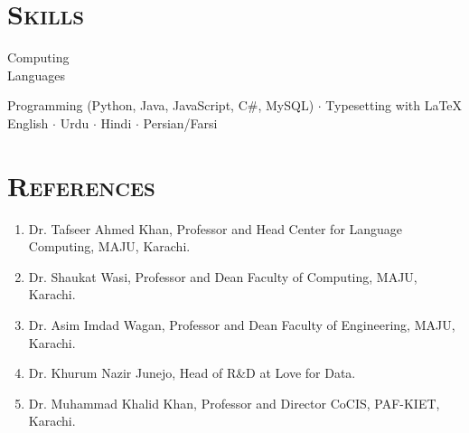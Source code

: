 \documentclass[a4paper, 10pt]{article}
\begin{document}
\section*{\normalfont\textsc{Skills}}
\hfill\begin{minipage}{0.17\textwidth}
Computing\textcolor{lightgray}{\dotfill}\\
Languages\textcolor{lightgray}{\dotfill}
\end{minipage}%
\begin{minipage}{0.8\textwidth}
Programming (Python, Java, JavaScript, C\#, MySQL) $\cdot$ Typesetting with \LaTeX\\
English $\cdot$ Urdu $\cdot$ Hindi $\cdot$ Persian/Farsi %
\end{minipage}

\section*{\normalfont\textsc{References}}
\begin{enumerate}
\itemsep-4pt
 \item Dr. Tafseer Ahmed Khan, Professor and Head Center for Language Computing, MAJU, Karachi.
 \item Dr. Shaukat Wasi, Professor and Dean Faculty of Computing, MAJU, Karachi.
 \item Dr. Asim Imdad Wagan, Professor and Dean Faculty of Engineering, MAJU, Karachi.
 \item Dr. Khurum Nazir Junejo, Head of R\&D at Love for Data.
 \item Dr. Muhammad Khalid Khan, Professor and Director CoCIS, PAF-KIET, Karachi.
\end{enumerate}
\end{document}
